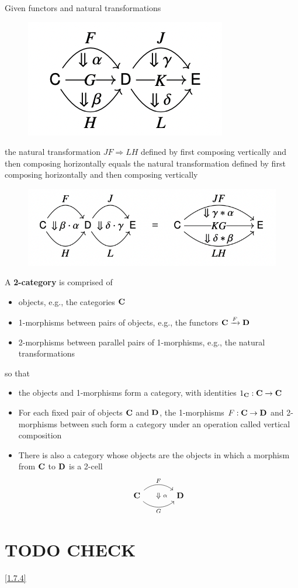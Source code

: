 \documentclass[11pt]{article}
\begin{document}
\begin{lemma}
Given functors and natural transformations
\begin{figure}[htbp]
\centering
\includegraphics[width=.3\textwidth]{../images/CategoryTheoryInContext/5.png}
\label{}
\end{figure}

the natural transformation \(JF\Rightarrow LH\) defined by first composing vertically and then composing
horizontally equals the natural transformation defined by first composing horizontally and then
composing vertically
\begin{figure}[htbp]
\centering
\includegraphics[width=.6\textwidth]{../images/CategoryTheoryInContext/6.png}
\label{}
\end{figure}
\end{lemma}

\begin{definition}[]
A \textbf{2-category} is comprised of
\begin{itemize}
\item objects, e.g., the categories \(\operatorname{\textbf{C}}\)
\item 1-morphisms between pairs of objects, e.g., the functors \(\operatorname{\textbf{C}}\xrightarrow{F}\operatorname{\textbf{D}}\)
\item 2-morphisms between parallel pairs of 1-morphisms, e.g., the natural transformations
\end{itemize}

so that
\begin{itemize}
\item the objects and 1-morphisms form a category, with identities \(1_{\operatorname{\textbf{C}}}:\operatorname{\textbf{C}}\to\operatorname{\textbf{C}}\)
\item For each fixed pair of objects \(\operatorname{\textbf{C}}\)  and \(\operatorname{\textbf{D}}\), the 1-morphisms \(F:\operatorname{\textbf{C}}\to\operatorname{\textbf{D}}\) and 2-morphisms
between such form a category under an operation called vertical composition
\item There is also a category whose objects are the objects in which a morphism from \(\operatorname{\textbf{C}}\) to \(\operatorname{\textbf{D}}\)
is a 2-cell
\begin{equation*}
\nat{\bC}{\bD}{F}{G}{\alpha}
\end{equation*}
\end{itemize}
\end{definition}





\section{{\bfseries\sffamily TODO} CHECK}
\label{sec:org0e660f3}
\ref{1.7.4}
\end{document}
